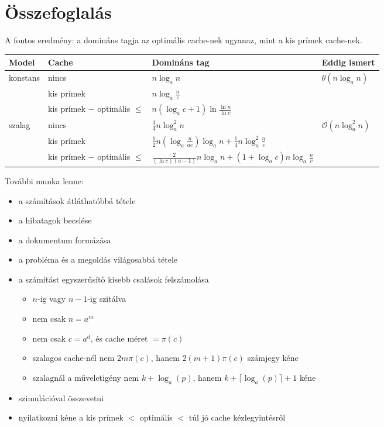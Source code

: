 \documentclass{article}
\begin{document}
\section{Összefoglalás}

A fontos eredmény: a domináns tagja az optimális cache-nek ugyanaz, mint a kis prímek cache-nek.

\begin{tabular}{|l|l|l|l|}
\hline
Model & Cache & Domináns tag & Eddig ismert \\
\hline
\multirow{3}{*}{konstans} & nincs & $n \log_{a}{n}$ & $\theta(n \log_{a}{n})$ \\
\cline{2-4}
 & kis prímek & $n \log_{a}{\frac{n}{c}}$ & \\
\cline{2-4}
 & kis prímek $-$ optimális $\le$ & $n \left( \log_{a}{c} + 1 \right) \ln{\frac{\ln{n}}{\ln{c}}}$ & \\
\hline
\multirow{3}{*}{szalag}  & nincs & $\frac{3}{4} n \log_{a}^2{n}$ & $\mathcal{O}(n \log^2_{a}{n})$ \\
\cline{2-4}
 & kis prímek & $\frac{1}{2} n \left( \log_{a}{\frac{n}{a c}} \right) \log_{a}{n} + \frac{1}{4} n \log_{a}^2{\frac{n}{c}}$ & \\
\cline{2-4}
 & kis prímek $-$ optimális $\le$ & $\frac{2 }{(\ln{c}) (a-1)} n \log_{a}{n} + \left( 1 + \log_{a}{c} \right) n \log_{a}{\frac{n}{c}}$ & \\
\hline
\end{tabular}

További munka lenne:
\begin{itemize}
\item a számítások átláthatóbbá tétele
\item a hibatagok becslése
\item a dokumentum formázása
\item a probléma és a megoldás világosabbá tétele
\item a számítást egyszerűsítő kisebb csalások felszámolása
\begin{itemize}
\item $n$-ig vagy $n-1$-ig szitálva
\item nem csak $n=a^m$
\item nem csak $c=a^d$, és cache méret $=\pi(c)$
\item szalagos cache-nél nem $2m\pi(c)$, hanem $2(m+1)\pi(c)$ számjegy kéne
\item szalagnál a műveletigény nem $k+\log_{a}(p)$, hanem $k+\lceil\log_{a}(p)\rceil+1$ kéne
\end{itemize}
\item szimulációval összevetni
\item nyilatkozni kéne a kis prímek $<$ optimális $<$ túl jó cache kézlegyintésről
\end{itemize}
\end{document}
